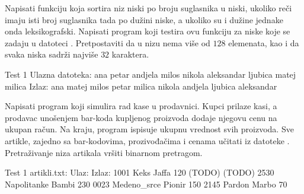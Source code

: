 \begin{Exercise}[label=511]
  Napisati funkciju koja sortira niz niski po broju suglasnika u
  niski, ukoliko reči imaju isti broj suglasnika tada po dužini niske,
  a ukoliko su i dužine jednake onda leksikografski.  Napisati program
  koji testira ovu funkciju za niske koje se zadaju u datoteci
  .  Pretpostaviti da u nizu nema više od $128$
  elemenata, kao i da svaka niska sadrži najviše $32$ karaktera.
  
\begin{maxitest}
\begin{test}{Test 1}
Ulazna datoteka:
ana petar andjela milos nikola aleksandar ljubica matej milica
Izlaz:
ana matej milos petar milica nikola andjela ljubica aleksandar
\end{test}
\end{maxitest}
  
\end{Exercise}

\begin{Exercise}[label=512]
  Napisati program koji simulira rad kase u prodavnici. Kupci prilaze
  kasi, a prodavac unošenjem bar-koda kupljenog proizvoda dodaje
  njegovu cenu na ukupan račun. Na kraju, program ispisuje ukupnu
  vrednost svih proizvoda. Sve artikle, zajedno sa bar-kodovima,
  prozivođačima i cenama učitati iz datoteke
  . Pretraživanje niza artikala vršiti binarnom
  pretragom.
  
\begin{maxitest}
\begin{test}{Test 1}
artikli.txt:                         Ulaz:           Izlaz:
1001 Keks Jaffa 120                  (TODO)          (TODO)
2530 Napolitanke Bambi	230
0023 Medeno_srce Pionir 150
2145 Pardon Marbo 70
\end{test}
\end{maxitest}
  
\end{Exercise}

